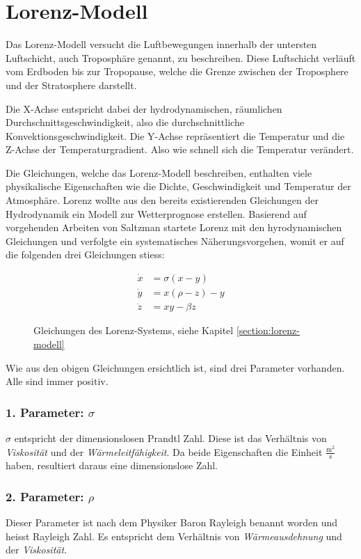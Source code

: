 

\section{Lorenz-Modell}\label{lorenz-modell}
Das Lorenz-Modell versucht die Luftbewegungen innerhalb der untersten Luftschicht, auch Troposphäre genannt, zu beschreiben. Diese Luftschicht verläuft vom Erdboden bis zur Tropopause, welche die Grenze zwischen der Troposphere und der Stratosphere darstellt.

Die X-Achse entspricht dabei der hydrodynamischen, räumlichen Durchschnittsgeschwindigkeit, also die durchschnittliche Konvektionsgeschwindigkeit. Die Y-Achse repräsentiert die Temperatur und die Z-Achse der Temperaturgradient. Also wie schnell sich die Temperatur verändert.

Die Gleichungen, welche das Lorenz-Modell beschreiben, enthalten viele physikalische Eigenschaften wie die Dichte, Geschwindigkeit und Temperatur der Atmosphäre. Lorenz wollte aus den bereits existierenden Gleichungen der Hydrodynamik ein Modell zur Wetterprognose erstellen. Basierend auf vorgehenden Arbeiten von Saltzman startete Lorenz mit den hyrodynamischen Gleichungen und verfolgte ein systematisches Näherungsvorgehen, womit er auf die folgenden drei Gleichungen stiess:
\begin{figure}
	\begin{align}
		\dot{x} &= \sigma(x - y)\\
		\dot{y} &= x(\rho - z) - y\\
		\dot{z} &= xy - \beta z
	\end{align}
	\caption{Gleichungen des Lorenz-Systems, siehe Kapitel \ref{section:lorenz-modell}}
\end{figure}

Wie aus den obigen Gleichungen ersichtlich ist, sind drei Parameter vorhanden. Alle sind immer positiv.

\subsubsection{1. Parameter: $\sigma$}
$\sigma$ entspricht der dimensionslosen Prandtl Zahl. Diese ist das Verhältnis von \textit{Viskosität} und der \textit{Wärmeleitfähigkeit}. Da beide Eigenschaften die Einheit $\frac{\text{m}^2}{\text{s}}$ haben, resultiert daraus eine dimensionslose Zahl.

\subsubsection{2. Parameter: $\rho$}
Dieser Parameter ist nach dem Physiker Baron Rayleigh benannt worden und heisst Rayleigh Zahl. Es entspricht dem Verhältnis von \textit{Wärmeausdehnung} und der \textit{Viskosität}.

